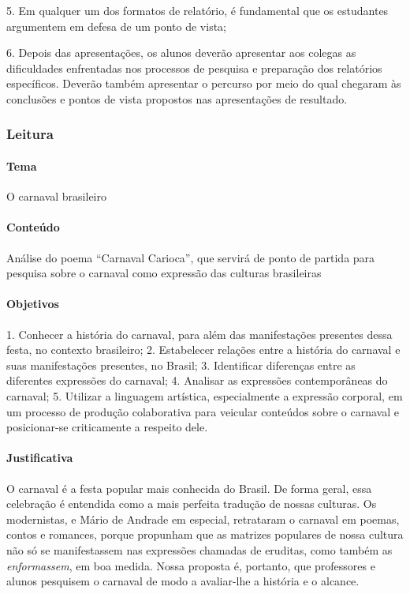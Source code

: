 \documentclass[11pt]{extarticle}
\begin{document}
5. Em qualquer um dos formatos de relatório, é fundamental que os
estudantes argumentem em defesa de um ponto de vista;

6. Depois das apresentações, os alunos deverão apresentar aos colegas as
dificuldades enfrentadas nos processos de pesquisa e preparação dos
relatórios específicos. Deverão também apresentar o percurso por meio do
qual chegaram às conclusões e pontos de vista propostos nas
apresentações de resultado.


\subsubsection{Leitura}



\paragraph{Tema} O carnaval brasileiro

\paragraph{Conteúdo} Análise do poema ``Carnaval Carioca'', que servirá de
ponto de partida para pesquisa sobre o carnaval como expressão das
culturas brasileiras

\paragraph{Objetivos} 1. Conhecer a história do carnaval, para além das
manifestações presentes dessa festa, no contexto brasileiro; 2.
Estabelecer relações entre a história do carnaval e suas manifestações
presentes, no Brasil; 3. Identificar diferenças entre as diferentes
expressões do carnaval; 4. Analisar as expressões contemporâneas do
carnaval; 5. Utilizar a linguagem artística, especialmente a expressão
corporal, em um processo de produção colaborativa para veicular
conteúdos sobre o carnaval e posicionar-se criticamente a respeito dele.

\paragraph{Justificativa} O carnaval é a festa popular mais conhecida do
Brasil. De forma geral, essa celebração é entendida como a mais perfeita
tradução de nossas culturas. Os modernistas, e Mário de Andrade em
especial, retrataram o carnaval em poemas, contos e romances, porque
propunham que as matrizes populares de nossa cultura não só se
manifestassem nas expressões chamadas de eruditas, como também as
\emph{enformassem}, em boa medida. Nossa proposta é, portanto, que
professores e alunos pesquisem o carnaval de modo a avaliar-lhe a
história e o alcance.
\end{document}
